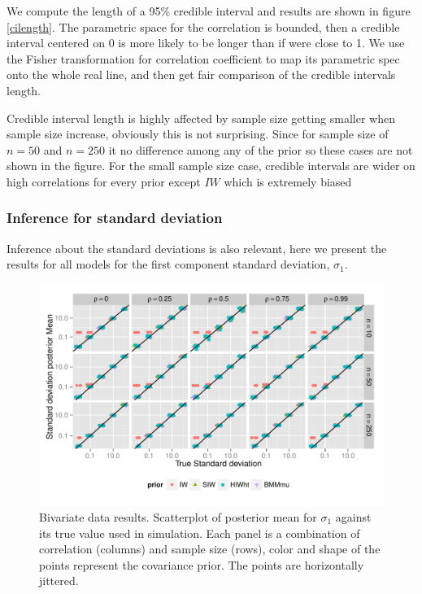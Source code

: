 \documentclass[a4paper]{article}
\begin{document}
We compute the length of a 95\% credible interval and results are shown in figure \ref{cilength}. The parametric space for the correlation is bounded, then a credible interval centered on 0 is more likely to be longer than if were close to 1. We use the Fisher transformation for correlation coefficient to  map its parametric spec onto the whole real line, and then get fair comparison of the credible intervals length. 

Credible interval length is highly affected by sample size getting smaller when sample size increase, obviously this is not surprising.  Since for sample size of $n=50$ and $n=250$ it no difference among any of the prior so these cases are not shown in the figure. For the small sample size case, credible intervals are wider on high correlations for every prior except $IW$ which is extremely biased

\subsubsection{Inference for standard deviation}
Inference about the standard deviations is also relevant, here we present the results for all models for the first component standard deviation, $\sigma_1$. 
\begin{figure}[htbp]
   \centering
   \includegraphics[width=\textwidth]{fig_s1_d2} 
    \vspace{-.5in}
   \caption{Bivariate data results. Scatterplot of posterior mean for $\sigma_1$  against its true value used in simulation. Each panel is a combination of correlation (columns) and sample size (rows),  color and shape of the points represent the covariance prior. The points are horizontally jittered. \label{devF1} }
\end{figure}
\end{document}
